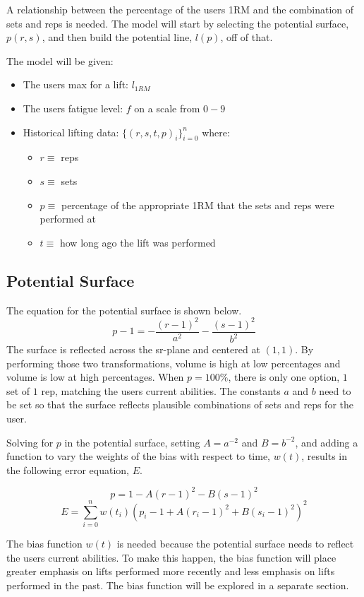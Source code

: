 A relationship between the percentage of the users 1RM and the combination of sets and reps is needed. The model will start by selecting the potential surface, $p(r,s)$, and then build the potential line, $l(p)$, off of that.

The model will be given:
\begin{itemize}
    \item The users max for a lift: $l_{1RM}$
    \item The users fatigue level: $f$ on a scale from $0-9$
    \item Historical lifting data: $\{(r,s,t,p)_i\}_{i=0}^{n}$ where:
    \begin{itemize}
        \item $r\equiv$ reps
        \item $s\equiv$ sets
        \item $p\equiv$ percentage of the appropriate 1RM that the sets and reps were performed at
        \item $t\equiv$ how long ago the lift was performed
    \end{itemize}
\end{itemize}


\subsection{Potential Surface}
The equation for the potential surface is shown below.
\begin{equation}
    p-1=-\frac{(r-1)^2}{a^2}-\frac{(s-1)^2}{b^2}
\end{equation}
The surface is reflected across the sr-plane and centered at $(1,1)$. By performing those two transformations, volume is high at low percentages and volume is low at high percentages. When $p=100\%$, there is only one option, $1$ set of $1$ rep, matching the users current abilities. The constants $a$ and $b$ need to be set so that the surface reflects plausible combinations of sets and reps for the user.

Solving for $p$ in the potential surface, setting $A=a^{-2}$ and $B=b^{-2}$, and adding a function to vary the weights of the bias with respect to time, $w(t)$, results in the following error equation, $E$.

\[ p=1-A(r-1)^2-B(s-1)^2 \]
\[ E=\sum_{i=0}^{n} w(t_i)\left(p_i-1+A(r_i-1)^2+B(s_i-1)^2 \right)^2 \]

The bias function $w(t)$ is needed because the potential surface needs to reflect the users current abilities. To make this happen, the bias function will place greater emphasis on lifts performed more recently and less emphasis on lifts performed in the past. The bias function will be explored in a separate section.

